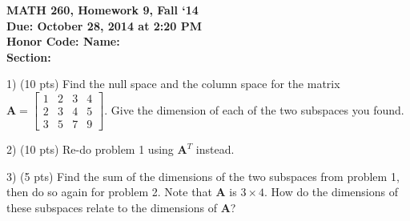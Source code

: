 \documentclass{article}
\begin{document}
\begin{flushleft}
	\bfseries{MATH 260, Homework 9, Fall `14}\\
	\bfseries{Due: October 28, 2014 at 2:20 PM}\\
	\bfseries{Honor Code:} \hspace{3.5in}\bfseries{Name:}\\
	\hspace{4.37in}\bfseries{Section:}
\end{flushleft}
\begin{flushleft}
\vspace{.25in}

1) (10 pts) Find the null space and the column space for the matrix $\textbf{A} = \begin{bmatrix} 1&2&3&4 \\ 2&3&4&5\\ 3&5&7&9 \end{bmatrix}$.  Give the dimension of each of the two subspaces you found.

\pagebreak

2) (10 pts) Re-do problem 1 using $\textbf{A}^T$ instead.

\vspace{6.5in}

3) (5 pts) Find the sum of the dimensions of the two subspaces from problem 1, then do so again for problem 2.  Note that $\textbf{A}$ is $3 \times 4$.  How do the dimensions of these subspaces relate to the dimensions of $\textbf{A}$?

\end{flushleft}
\end{document}
